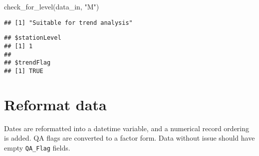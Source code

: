 \documentclass[
]{article}
\newenvironment{Shaded}{\begin{snugshade}}{\end{snugshade}}
\newcommand{\FunctionTok}[1]{\textcolor[rgb]{0.00,0.00,0.00}{#1}}
\newcommand{\NormalTok}[1]{#1}
\newcommand{\StringTok}[1]{\textcolor[rgb]{0.31,0.60,0.02}{#1}}
\begin{document}
\begin{Shaded}
\begin{Highlighting}[]
\FunctionTok{check\_for\_level}\NormalTok{(data\_in, }\StringTok{"M"}\NormalTok{)}
\end{Highlighting}
\end{Shaded}

\begin{verbatim}
## [1] "Suitable for trend analysis"
\end{verbatim}

\begin{verbatim}
## $stationLevel
## [1] 1
## 
## $trendFlag
## [1] TRUE
\end{verbatim}

\hypertarget{reformat-data}{%
\section{Reformat data}\label{reformat-data}}

Dates are reformatted into a datetime variable, and a numerical record
ordering is added. QA flags are converted to a factor form. Data without
issue should have empty \texttt{QA\_Flag} fields.
\end{document}
